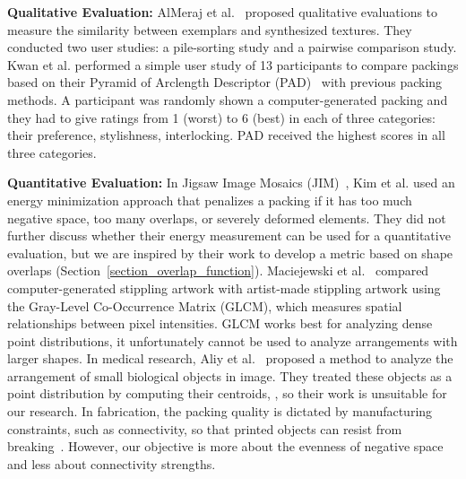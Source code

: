 \textbf{Qualitative Evaluation:}
AlMeraj et al.~\cite{AlMerajEval2013} proposed qualitative evaluations to measure
the similarity between exemplars and synthesized textures.
They conducted two user studies: a pile-sorting study and a pairwise comparison study.
Kwan et al. performed a simple user study of 13 participants to compare 
packings based on their Pyramid of Arclength Descriptor (PAD)~\cite{Kwan2016} with previous packing methods.
A participant was randomly shown a computer-generated packing and they had to give ratings from 1 (worst) to 6 (best)
in each of three categories: their preference, stylishness, interlocking.
 PAD received the highest scores in all three categories.

\newtext
{
\textbf{Quantitative Evaluation:}
In Jigsaw Image Mosaics (JIM)~\cite{Kim2002}, Kim et al. used an energy minimization approach
that penalizes a packing if it has too much negative space,
too many overlaps, or severely deformed elements. 
They did not further discuss whether their energy measurement can be used for a quantitative evaluation,
but we are inspired by their work to develop a metric based on shape overlaps (Section~\ref{section_overlap_function}).
Maciejewski et al.~\cite{Maciejewski2008} compared computer-generated stippling artwork
with artist-made stippling artwork using the Gray-Level Co-Occurrence Matrix (GLCM),
which measures spatial relationships between pixel intensities.
GLCM works best for analyzing dense point distributions,  it unfortunately cannot be used to analyze arrangements with larger shapes.
In medical research, Aliy et al.~\cite{Aliy2013} proposed a method to analyze the arrangement of 
small biological objects in  image.
They treated these objects as a point distribution by computing their centroids, 
, 
so their work is unsuitable for our research.
In fabrication, the packing quality is dictated by manufacturing constraints, such as connectivity,
so that printed objects can resist from breaking~\cite{Chen2016, Zehnder2016, Martinez2019}.
However, our objective is more about the evenness of negative space and less about connectivity strengths.
}



